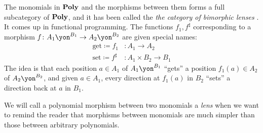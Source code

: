 \documentclass[Book-Poly]{subfiles}
\begin{document}
The monomials in $\mathbf{Poly}$ and the morphisms between them forms a full subcategory of $\mathbf{Poly}$, and it has been called the \emph{the category of bimorphic lenses} \cite{hedges2018limits}. It comes up in functional programming. The functions $f_1, f^\sharp$ corresponding to a morphism $f \colon A_1\yon^{B_1}\to A_2\yon^{B_2}$ are given special names:
\begin{equation}\label{eqn.bimorphic_lens}
\begin{aligned}
	\text{get} \coloneqq f_1 &\colon A_1\to A_2\\
	\text{set} \coloneqq f^\sharp &\colon A_1\times B_2\to B_1
\end{aligned}
\end{equation}
The idea is that each position $a \in A_1$ of $A_1\yon^{B_1}$ ``gets'' a position $f_1(a) \in A_2$ of $A_2\yon^{B_2}$, and given $a \in A_1$, every direction at $f_1(a)$ in $B_2$ ``sets'' a direction back at $a$ in $B_1$.

We will call a polynomial morphism between two monomials a \emph{lens} when we want to remind the reader that morphisms between monomials are much simpler than those between arbitrary polynomials.
\end{document}
